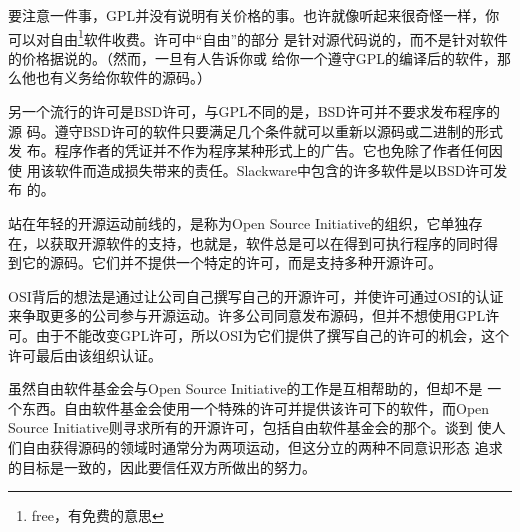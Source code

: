 要注意一件事，GPL并没有说明有关价格的事。也许就像听起来很奇怪一样，你
可以对自由\footnote{free，有免费的意思}软件收费。许可中``自由''的部分
是针对源代码说的，而不是针对软件的价格据说的。（然而，一旦有人告诉你或
给你一个遵守GPL的编译后的软件，那么他也有义务给你软件的源码。）

另一个流行的许可是BSD许可，与GPL不同的是，BSD许可并不要求发布程序的源
码。遵守BSD许可的软件只要满足几个条件就可以重新以源码或二进制的形式发
布。程序作者的凭证并不作为程序某种形式上的广告。它也免除了作者任何因使
用该软件而造成损失带来的责任。Slackware中包含的许多软件是以BSD许可发布
的。

站在年轻的开源运动前线的，是称为Open Source Initiative的组织，它单独存
在，以获取开源软件的支持，也就是，软件总是可以在得到可执行程序的同时得
到它的源码。它们并不提供一个特定的许可，而是支持多种开源许可。

OSI背后的想法是通过让公司自己撰写自己的开源许可，并使许可通过OSI的认证
来争取更多的公司参与开源运动。许多公司同意发布源码，但并不想使用GPL许
可。由于不能改变GPL许可，所以OSI为它们提供了撰写自己的许可的机会，这个
许可最后由该组织认证。

虽然自由软件基金会与Open Source Initiative的工作是互相帮助的，但却不是
一个东西。自由软件基金会使用一个特殊的许可并提供该许可下的软件，而Open
Source Initiative则寻求所有的开源许可，包括自由软件基金会的那个。谈到
使人们自由获得源码的领域时通常分为两项运动，但这分立的两种不同意识形态
追求的目标是一致的，因此要信任双方所做出的努力。

